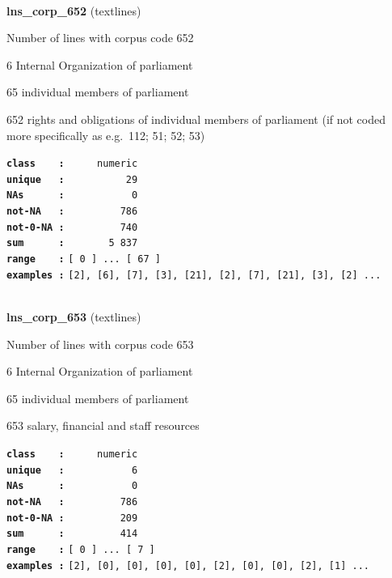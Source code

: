 \documentclass[]{article}
\begin{document}
~

\textbf{lns\_corp\_652} (textlines)

Number of lines with corpus code 652

6 Internal Organization of parliament

65 individual members of parliament

652 rights and obligations of individual members of parliament (if not
coded more specifically as e.g.~112; 51; 52; 53)

\textbf{\texttt{class\ \ \ \ :}} \texttt{~~~~~numeric}\\
\textbf{\texttt{unique\ \ \ :}} \texttt{~~~~~~~~~~29}\\
\textbf{\texttt{NAs\ \ \ \ \ \ :}} \texttt{~~~~~~~~~~~0}\\
\textbf{\texttt{not-NA\ \ \ :}} \texttt{~~~~~~~~~786}\\
\textbf{\texttt{not-0-NA\ :}} \texttt{~~~~~~~~~740}\\
\textbf{\texttt{sum\ \ \ \ \ \ :}} \texttt{~~~~~~~5~837}\\
\textbf{\texttt{range\ \ \ \ :}}
\texttt{{[}\ 0\ {]}\ ...\ {[}\ 67\ {]}}\\
\textbf{\texttt{examples\ :}}
\texttt{{[}2{]},\ {[}6{]},\ {[}7{]},\ {[}3{]},\ {[}21{]},\ {[}2{]},\ {[}7{]},\ {[}21{]},\ {[}3{]},\ {[}2{]}\ ...}\\

~

\textbf{lns\_corp\_653} (textlines)

Number of lines with corpus code 653

6 Internal Organization of parliament

65 individual members of parliament

653 salary, financial and staff resources

\textbf{\texttt{class\ \ \ \ :}} \texttt{~~~~~numeric}\\
\textbf{\texttt{unique\ \ \ :}} \texttt{~~~~~~~~~~~6}\\
\textbf{\texttt{NAs\ \ \ \ \ \ :}} \texttt{~~~~~~~~~~~0}\\
\textbf{\texttt{not-NA\ \ \ :}} \texttt{~~~~~~~~~786}\\
\textbf{\texttt{not-0-NA\ :}} \texttt{~~~~~~~~~209}\\
\textbf{\texttt{sum\ \ \ \ \ \ :}} \texttt{~~~~~~~~~414}\\
\textbf{\texttt{range\ \ \ \ :}}
\texttt{{[}\ 0\ {]}\ ...\ {[}\ 7\ {]}}\\
\textbf{\texttt{examples\ :}}
\texttt{{[}2{]},\ {[}0{]},\ {[}0{]},\ {[}0{]},\ {[}0{]},\ {[}2{]},\ {[}0{]},\ {[}0{]},\ {[}2{]},\ {[}1{]}\ ...}\\
\end{document}
